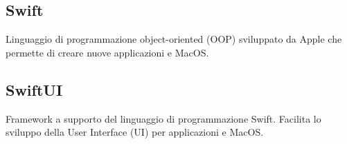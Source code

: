 \subsection*{Swift}
Linguaggio di programmazione object-oriented (OOP) sviluppato da Apple che permette di creare nuove applicazioni  e MacOS.  
\subsection*{SwiftUI}
Framework a supporto del linguaggio di programmazione Swift. Facilita lo sviluppo della User Interface (UI) per applicazioni  e MacOS.